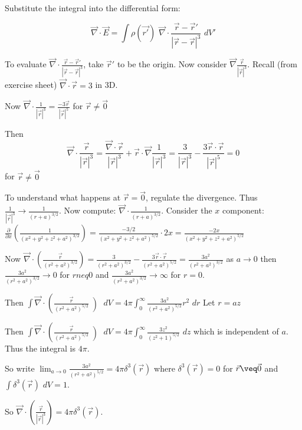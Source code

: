 Substitute the integral into the differential form:

$$\vec{\nabla} \cdot \vec{E} = \int \rho (\vec{r'}) \, \, \vec{\nabla} \cdot \frac{\vec{r} - \vec{r}'}{|\vec{r} - \vec{r}|^3} \, \, dV'$$

To evaluate $\vec{\nabla} \cdot \frac{\vec{r} - \vec{r}'}{|\vec{r} - \vec{r}|^3}$, take $\vec{r}'$ to be the origin. Now consider $\vec{\nabla} \frac{\vec{r}}{|\vec{r}|^3}$. Recall (from exercise sheet) $\vec{\nabla} \cdot \vec{r} = 3$ in 3D.

Now $\vec{\nabla} \cdot \frac{1}{| \vec{r} |^3} = \frac{-3 \vec{r}}{|\vec{r}|^5}$ for $\vec{r} \neq \vec{0}$

Then $$\vec{\nabla} \cdot \frac{\vec{r}}{|\vec{r}|^3} = \frac{\vec{\nabla} \cdot \vec{r}}{|\vec{r}|^3} + \vec{r} \cdot \vec{\nabla} \frac{1}{|\vec{r}|^3} = \frac{3}{|\vec{r}|^3} - \frac{3 \vec{r} \cdot \vec{r}}{|\vec{r}|^5} = 0$$ for $\vec{r} \neq \vec{0}$

To understand what happens at $\vec{r} = \vec{0}$, regulate the divergence. Thus $\frac{1}{|\vec{r}|^3} \rightarrow \frac{1}{(r+a)^{3/2}}$. Now compute: $\vec{\nabla} \cdot \frac{1}{(r+a)^{3/2}}$. Consider the $x$ component: $\frac{\partial}{\partial x} \left(\frac{1}{(x^2 + y^2 + z^2 + a^2)^{3/2}}\right) = \frac{- 3/2}{(x^2 + y^2 + z^2 + a^2)^{5/2}} \cdot 2x = \frac{-2x}{(x^2 + y^2 + z^2 + a^2)^{5/2}}$

Now $\vec{\nabla} \cdot \left( \frac{\vec{r}}{(r^2 + a^2)^{3/2}}\right) = \frac{3}{(r^2 + a^2)^{3/2}} - \frac{3 \vec{r} \cdot \vec{r}}{(r^2 + a^2)^{5/2}} = \frac{3a^2}{(r^2 + a^2)^{3/2}}$ as $a \rightarrow 0$ then $\frac{3a^2}{(r^2 + a^2)^{3/2}} \rightarrow 0$ for $r neq 0$ and $\frac{3a^2}{(r^2 + a^2)^{3/2}} \rightarrow \infty$ for $r = 0$.

Then $\int \vec{\nabla} \cdot \left(\frac{\vec{r}}{(r^2 + a^2)^{5/2}}\left) \, \, dV = 4 \pi \int_0^{\infty} \frac{3a^2}{(r^2 + a^2)^{5/2}} r^2 \, \, dr$ Let $r = az$

Then $\int \vec{\nabla} \cdot \left(\frac{\vec{r}}{(r^2 + a^2)^{5/2}}\left) \, \, dV = 4 \pi \int_0^{\infty} \frac{3 z^2}{(z^2 + 1)^{5/2}} \, \, dz$ which is independent of $a$. Thus the integral is $4 \pi$.

So write $\lim_{a \rightarrow 0} \frac{3a^2}{(r^2 + a^2)^{5/2}} = 4 \pi \delta^3(\vec{r})$ where $\delta^3(\vec{r}) = 0$ for $\vec{r} \veq \vec{0}$ and $\int \delta^3 (\vec{r}) \, \, dV = 1$.

So $\vec{\nabla} \cdot \left(\frac{\vec{r}}{|\vec{r}|^3}\right) = 4 \pi \delta^3(\vec{r})$.

